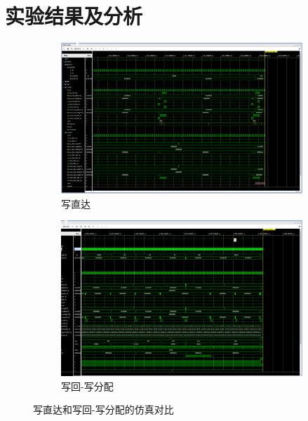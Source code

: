 \section{实验结果及分析}
\begin{figure}[H]
  \centering

  \begin{subfigure}[b]{0.6\textwidth}
    \centering
    \includegraphics[width=\textwidth]{image/wt.png}
    \caption{写直达}
    \label{fig:sub-a}
  \end{subfigure}
  \hfill
  \begin{subfigure}[b]{0.6\textwidth}
    \centering
    \includegraphics[width=\textwidth]{image/wb.png}
    \caption{写回-写分配}
    \label{fig:sub-b}
  \end{subfigure}

  \caption{写直达和写回-写分配的仿真对比}
  \label{fig:sim_compare}
\end{figure}
